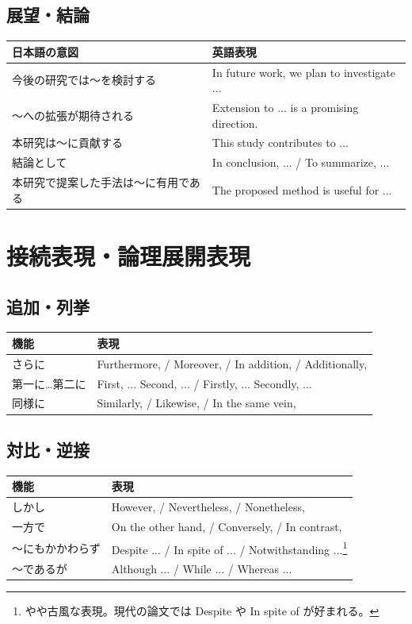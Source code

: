 \subsection*{展望・結論}

\begin{table}[H]
\centering
\small
\begin{tabular}{p{4cm}p{6cm}}
\toprule
日本語の意図 & 英語表現 \\
\midrule
今後の研究では〜を検討する & In future work, we plan to investigate ... \\
〜への拡張が期待される & Extension to ... is a promising direction. \\
本研究は〜に貢献する & This study contributes to ... \\
結論として & In conclusion, ... / To summarize, ... \\
本研究で提案した手法は〜に有用である & The proposed method is useful for ... \\
\bottomrule
\end{tabular}
\end{table}

\section{接続表現・論理展開表現}

\subsection*{追加・列挙}

\begin{table}[H]
\centering
\small
\begin{tabular}{ll}
\toprule
機能 & 表現 \\
\midrule
さらに & Furthermore, / Moreover, / In addition, / Additionally, \\
第一に…第二に & First, ... Second, ... / Firstly, ... Secondly, ... \\
同様に & Similarly, / Likewise, / In the same vein, \\
\bottomrule
\end{tabular}
\end{table}

\subsection*{対比・逆接}

\begin{table}[H]
\centering
\small
\begin{tabular}{ll}
\toprule
機能 & 表現 \\
\midrule
しかし & However, / Nevertheless, / Nonetheless, \\
一方で & On the other hand, / Conversely, / In contrast, \\
〜にもかかわらず & Despite ... / In spite of ... / Notwithstanding ...\footnote{やや古風な表現。現代の論文では Despite や In spite of が好まれる。} \\
〜であるが & Although ... / While ... / Whereas ... \\
\bottomrule
\end{tabular}
\end{table}


